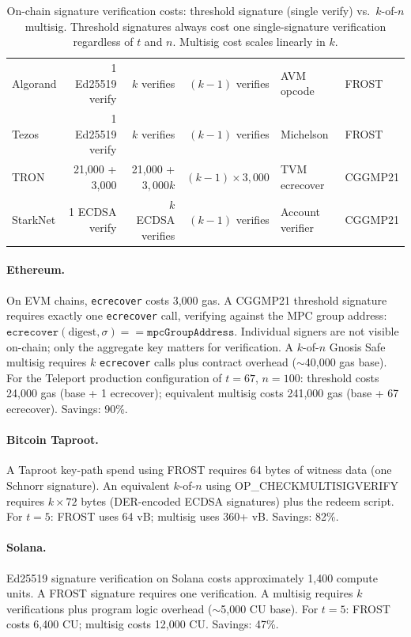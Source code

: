 \documentclass[11pt,twocolumn]{article}
\begin{document}
\begin{table}[t]
\begin{tabular}{@{}lrrrll@{}}
Algorand & 1 Ed25519 verify & $k$ verifies & $(k{-}1)$ verifies & AVM opcode & FROST \\
Tezos & 1 Ed25519 verify & $k$ verifies & $(k{-}1)$ verifies & Michelson & FROST \\
TRON & 21,000 + 3,000 & 21,000 + $3{,}000k$ & $(k{-}1) \times 3{,}000$ & TVM ecrecover & CGGMP21 \\
StarkNet & 1 ECDSA verify & $k$ ECDSA verifies & $(k{-}1)$ verifies & Account verifier & CGGMP21 \\
\bottomrule
\end{tabular}
\caption{On-chain signature verification costs: threshold signature (single verify) vs.\ $k$-of-$n$ multisig. Threshold signatures always cost one single-signature verification regardless of $t$ and $n$. Multisig cost scales linearly in $k$.}
\label{tab:gas}
\end{table}

\paragraph{Ethereum.} On EVM chains, \texttt{ecrecover} costs 3,000 gas. A
CGGMP21 threshold signature requires exactly one \texttt{ecrecover} call, verifying
against the MPC group address: $\texttt{ecrecover}(\text{digest}, \sigma) ==
\texttt{mpcGroupAddress}$. Individual signers are not visible on-chain; only the
aggregate key matters for verification. A $k$-of-$n$ Gnosis Safe multisig requires
$k$ \texttt{ecrecover} calls plus contract overhead ($\sim$40,000 gas base). For
the Teleport production configuration of $t = 67$, $n = 100$: threshold costs
24,000 gas (base + 1 ecrecover); equivalent multisig costs 241,000 gas (base + 67
ecrecover). Savings: 90\%.

\paragraph{Bitcoin Taproot.} A Taproot key-path spend using FROST requires 64 bytes
of witness data (one Schnorr signature). An equivalent $k$-of-$n$ using
OP\_CHECKMULTISIGVERIFY requires $k \times 72$ bytes (DER-encoded ECDSA signatures)
plus the redeem script. For $t = 5$: FROST uses 64 vB; multisig uses 360+ vB.
Savings: 82\%.

\paragraph{Solana.} Ed25519 signature verification on Solana costs approximately
1,400 compute units. A FROST signature requires one verification. A multisig requires
$k$ verifications plus program logic overhead ($\sim$5,000 CU base). For $t = 5$:
FROST costs 6,400 CU; multisig costs 12,000 CU. Savings: 47\%.
\end{document}
